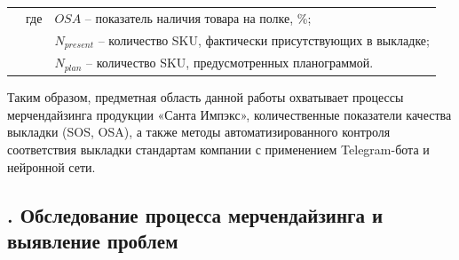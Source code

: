 {  \begin{tabular}{p{}p{}p{}}
    & где  & $OSA$ {--} показатель наличия товара на полке, \%; \\
    &      & $N_{present}$ {--} количество SKU, фактически присутствующих в выкладке; \\
    &      & $N_{plan}$ {--} количество SKU, предусмотренных планограммой. \\
  \end{tabular}
  \vspace{13pt}
  
  \par \redline Таким образом, предметная область данной работы охватывает процессы
  мерчендайзинга продукции «Санта Импэкс», количественные показатели качества
  выкладки (SOS, OSA), а также методы автоматизированного контроля соответствия
  выкладки стандартам компании с применением Telegram-бота и нейронной сети.

  \par
}

\subtitlespace

\subsection*{
  \gostTitleFont
  \redline
  \thechaptercntr .\thesubchaptercntr \spc
  Обследование процесса мерчендайзинга и выявление проблем
} \addtocounter{subchaptercntr}{1}

\subtitlespace

